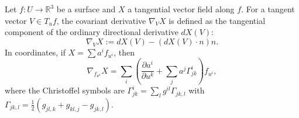 Let $f: U \to \mathbb{R}^3$ be a surface and $X$ a tangential vector field along $f$. For a tangent vector $V \in T_u f$, the covariant derivative $\nabla_V X$ is defined as the tangential component of the ordinary directional derivative $dX(V)$:
$$\nabla_V X := dX(V) - (dX(V) \cdot n)n.$$
In coordinates, if $X = \sum a^i f_{u^i}$, then
$$\nabla_{f_{u^k}} X = \sum_i \left( \frac{\partial a^i}{\partial u^k} + \sum_j a^j \Gamma_{jk}^i \right) f_{u^i},$$
where the Christoffel symbols are $\Gamma_{jk}^i = \sum_l g^{il} \Gamma_{jk,l}$ with $\Gamma_{jk,l} = \frac{1}{2}(g_{jl,k} + g_{kl,j} - g_{jk,l})$.